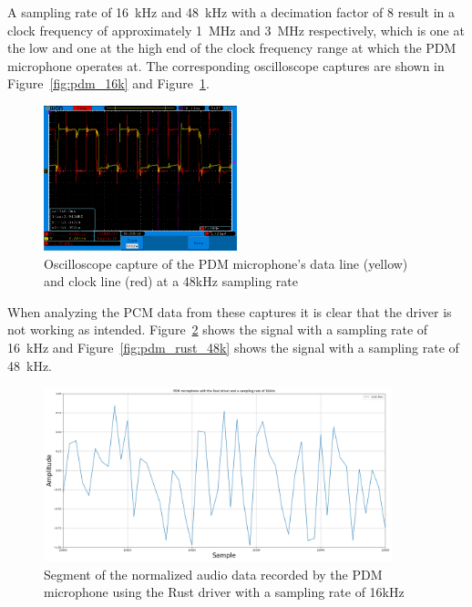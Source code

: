 A sampling rate of \SI{16}{\kilo\hertz} and \SI{48}{\kilo\hertz} with a decimation factor of 8
result in a clock frequency of approximately \SI{1}{\mega\hertz} and \SI{3}{\mega\hertz} respectively,
which is one at the low and one at the high end of the clock frequency range at which the PDM
microphone operates at.
The corresponding oscilloscope captures are shown in Figure~\ref{fig:pdm_16k} and Figure~\ref{fig:pdm_48k}.

\begin{figure}[H]
    \begin{center}
        \includegraphics[width=0.5\textwidth]{figures/48k_3mhz_sine.png}
    \end{center}
    \caption[Oscilloscope capture of the PDM microphone's data line (yellow) and clock line (red) at a 48kHz sampling rate]{Oscilloscope capture of the PDM microphone's data line (yellow) and clock line (red) at a 48kHz sampling rate}
    \label{fig:pdm_48k}
\end{figure}

When analyzing the PCM data from these captures it is clear that the driver is not working as intended.
Figure~\ref{fig:pdm_rust_16k} shows the signal with a sampling rate of \SI{16}{\kilo\hertz} and
Figure~\ref{fig:pdm_rust_48k} shows the signal with a sampling rate of \SI{48}{\kilo\hertz}.

\begin{figure}[H]
    \centering
    \includegraphics[width=0.9\textwidth]{figures/pdm/pdm_rust_16k.png}
    \caption[Segment of the normalized audio data recorded by the PDM microphone using the Rust driver with a sampling rate of 16kHz]
    {Segment of the normalized audio data recorded by the PDM microphone using the Rust driver with a sampling rate of 16kHz}
    \label{fig:pdm_rust_16k}
\end{figure}

